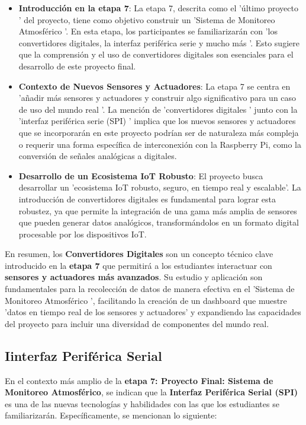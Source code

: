 \documentclass{report}
\begin{document}
\begin{itemize}
    \item \textbf{Introducción en la etapa 7}: La etapa 7, descrita como el  'último proyecto ' del proyecto, tiene como objetivo construir un  
    'Sistema de Monitoreo Atmosférico '. En esta etapa, los participantes se familiarizarán con  'los convertidores digitales, la interfaz periférica 
    serie y mucho más '. Esto sugiere que la comprensión y el uso de convertidores digitales son esenciales para el desarrollo de este proyecto final.
    \item \textbf{Contexto de Nuevos Sensores y Actuadores}: La etapa 7 se centra en  'añadir más sensores y actuadores y construir algo significativo 
    para un caso de uso del mundo real '. La mención de  'convertidores digitales ' junto con la  'interfaz periférica serie (SPI) ' implica que los 
    nuevos sensores y actuadores que se incorporarán en este proyecto podrían ser de naturaleza más compleja o requerir una forma específica de 
    interconexión con la Raspberry Pi, como la conversión de señales analógicas a digitales.
    \item \textbf{Desarrollo de un Ecosistema IoT Robusto}: El proyecto busca desarrollar un  'ecosistema IoT robusto, seguro, en tiempo real y escalable'. 
    La introducción de convertidores digitales es fundamental para lograr esta robustez, ya que permite la integración de una gama más amplia de sensores 
    que pueden generar datos analógicos, transformándolos en un formato digital procesable por los dispositivos IoT.
\end{itemize}
En resumen, los \textbf{Convertidores Digitales} son un concepto técnico clave introducido en la \textbf{etapa 7} que permitirá a los estudiantes 
interactuar con \textbf{sensores y actuadores más avanzados}. Su estudio y aplicación son fundamentales para la recolección de datos de manera efectiva 
en el  'Sistema de Monitoreo Atmosférico ', facilitando la creación de un dashboard que muestre  'datos en tiempo real de los sensores y actuadores' 
y expandiendo las capacidades del proyecto para incluir una diversidad de componentes del mundo real.

\subsection{Iinterfaz Periférica Serial}
En el contexto más amplio de la \textbf{etapa 7: Proyecto Final: Sistema de Monitoreo Atmosférico}, se  indican que la 
\textbf{Interfaz Periférica Serial (SPI)} es una de las nuevas tecnologías y habilidades con las que los estudiantes se familiarizarán. 
Específicamente, se  mencionan lo siguiente:
\end{document}
